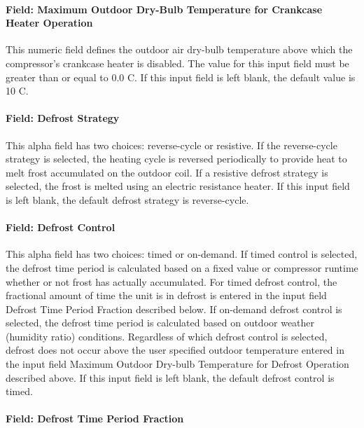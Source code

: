 \paragraph{Field: Maximum Outdoor Dry-Bulb Temperature for Crankcase Heater Operation}\label{field-maximum-outdoor-dry-bulb-temperature-for-crankcase-heater-operation-4}

This numeric field defines the outdoor air dry-bulb temperature above which the compressor's crankcase heater is disabled. The value for this input field must be greater than or equal to 0.0 C. If this input field is left blank, the default value is 10 C.

\paragraph{Field: Defrost Strategy}\label{field-defrost-strategy}

This alpha field has two choices: reverse-cycle or resistive. If the reverse-cycle strategy is selected, the heating cycle is reversed periodically to provide heat to melt frost accumulated on the outdoor coil. If a resistive defrost strategy is selected, the frost is melted using an electric resistance heater. If this input field is left blank, the default defrost strategy is reverse-cycle.

\paragraph{Field: Defrost Control}\label{field-defrost-control}

This alpha field has two choices: timed or on-demand. If timed control is selected, the defrost time period is calculated based on a fixed value or compressor runtime whether or not frost has actually accumulated. For timed defrost control, the fractional amount of time the unit is in defrost is entered in the input field Defrost Time Period Fraction described below. If on-demand defrost control is selected, the defrost time period is calculated based on outdoor weather (humidity ratio) conditions. Regardless of which defrost control is selected, defrost does not occur above the user specified outdoor temperature entered in the input field Maximum Outdoor Dry-bulb Temperature for Defrost Operation described above. If this input field is left blank, the default defrost control is timed.

\paragraph{Field: Defrost Time Period Fraction}\label{field-defrost-time-period-fraction}

